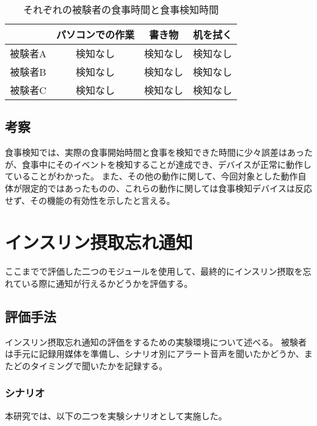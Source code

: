 \begin{table}[htbp]
  \caption{それぞれの被験者の食事時間と食事検知時間}
  \label{tb:others_detection_result}
  \begin{center}
    \begin{tabular}{|c||c|c|c|}
      \hline
       & パソコンでの作業 & 書き物 & 机を拭く \\
      \hline\hline
      被験者A & 検知なし & 検知なし & 検知なし \\\hline
      被験者B & 検知なし & 検知なし & 検知なし \\\hline
      被験者C & 検知なし & 検知なし & 検知なし \\\hline
    \end{tabular}
  \end{center}
\end{table}

\subsection{考察}

食事検知では、実際の食事開始時間と食事を検知できた時間に少々誤差はあったが、食事中にそのイベントを検知することが達成でき、デバイスが正常に動作していることがわかった。
また、その他の動作に関して、今回対象とした動作自体が限定的ではあったものの、これらの動作に関しては食事検知デバイスは反応せず、その機能の有効性を示したと言える。

\section{インスリン摂取忘れ通知}
ここまでで評価した二つのモジュールを使用して、最終的にインスリン摂取を忘れている際に通知が行えるかどうかを評価する。

\subsection{評価手法}
インスリン摂取忘れ通知の評価をするための実験環境について述べる。
被験者は手元に記録用媒体を準備し、シナリオ別にアラート音声を聞いたかどうか、またどのタイミングで聞いたかを記録する。

\subsubsection{シナリオ}

本研究では、以下の二つを実験シナリオとして実施した。

